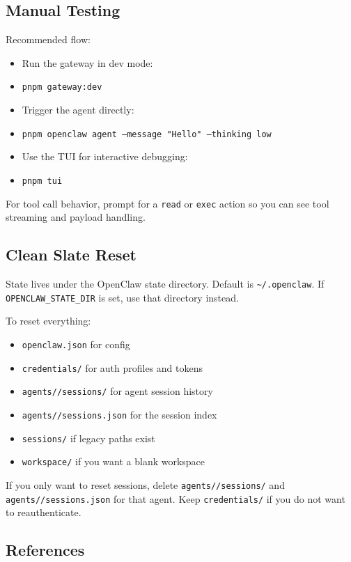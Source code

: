 \subsection{Manual Testing}


Recommended flow:

\begin{itemize}
  \item Run the gateway in dev mode:
  \item \texttt{pnpm gateway:dev}
  \item Trigger the agent directly:
  \item \texttt{pnpm openclaw agent --message "Hello" --thinking low}
  \item Use the TUI for interactive debugging:
  \item \texttt{pnpm tui}
\end{itemize}


For tool call behavior, prompt for a \texttt{read} or \texttt{exec} action so you can see tool streaming and payload handling.

\subsection{Clean Slate Reset}


State lives under the OpenClaw state directory. Default is \texttt{\textasciitilde{}/.openclaw}. If \texttt{OPENCLAW\_STATE\_DIR} is set, use that directory instead.

To reset everything:

\begin{itemize}
  \item \texttt{openclaw.json} for config
  \item \texttt{credentials/} for auth profiles and tokens
  \item \texttt{agents//sessions/} for agent session history
  \item \texttt{agents//sessions.json} for the session index
  \item \texttt{sessions/} if legacy paths exist
  \item \texttt{workspace/} if you want a blank workspace
\end{itemize}


If you only want to reset sessions, delete \texttt{agents//sessions/} and \texttt{agents//sessions.json} for that agent. Keep \texttt{credentials/} if you do not want to reauthenticate.

\subsection{References}


